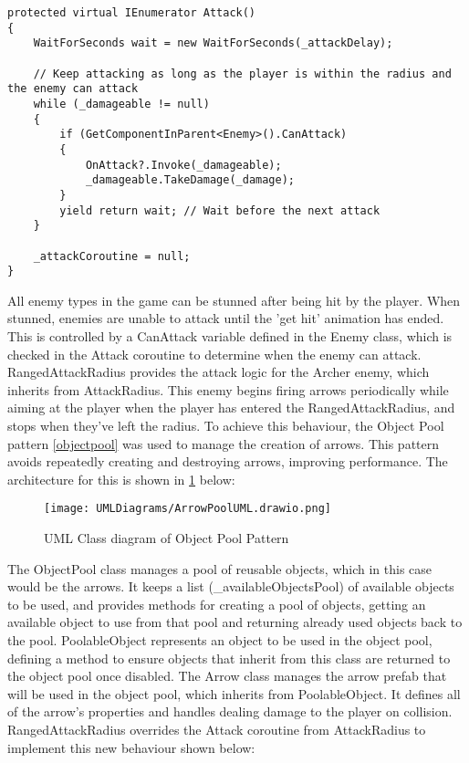 \documentclass[10pt]{final_report}
\begin{document}
\begin{verbatim}
protected virtual IEnumerator Attack()
{
    WaitForSeconds wait = new WaitForSeconds(_attackDelay);

    // Keep attacking as long as the player is within the radius and the enemy can attack
    while (_damageable != null)
    {
        if (GetComponentInParent<Enemy>().CanAttack)
        {
            OnAttack?.Invoke(_damageable);
            _damageable.TakeDamage(_damage);
        }
        yield return wait; // Wait before the next attack
    }

    _attackCoroutine = null;
}
\end{verbatim}
All enemy types in the game can be stunned after being hit by the player. When stunned, enemies are unable to attack until the 'get hit' animation has ended. This is controlled by a CanAttack variable defined in the Enemy class, which is checked in the Attack coroutine to determine when the enemy can attack. RangedAttackRadius provides the attack logic for the Archer enemy, which inherits from AttackRadius. This enemy begins firing arrows periodically while aiming at the player when the player has entered the RangedAttackRadius, and stops when they've left the radius. To achieve this behaviour, the Object Pool pattern \ref{objectpool} was used to manage the creation of arrows. This pattern avoids repeatedly creating and destroying arrows, improving performance. The architecture for this is shown in \ref{fig:label_objpool} below:
\begin{figure}[H]
    \centering
    \texttt{[image: UMLDiagrams/ArrowPoolUML.drawio.png]}
    \caption{UML Class diagram of Object Pool Pattern}
    \label{fig:label_objpool}
\end{figure}
The ObjectPool class manages a pool of reusable objects, which in this case would be the arrows. It keeps a list (\_availableObjectsPool) of available objects to be used, and provides methods for creating a pool of objects, getting an available object to use from that pool and returning already used objects back to the pool. PoolableObject represents an object to be used in the object pool, defining a method to ensure objects that inherit from this class are returned to the object pool once disabled. The Arrow class manages the arrow prefab that will be used in the object pool, which inherits from PoolableObject. It defines all of the arrow's properties and handles dealing damage to the player on collision. RangedAttackRadius overrides the Attack coroutine from AttackRadius to implement this new behaviour shown below:
\end{document}
